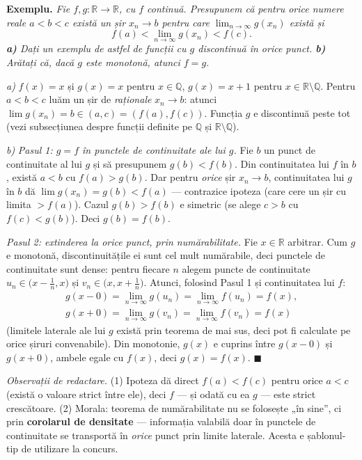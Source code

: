 \textbf{Exemplu.} \emph{Fie $f,g:\mathbb{R}\to\mathbb{R}$, cu $f$ continuă. Presupunem că pentru orice numere reale $a<b<c$ există un șir $x_n\to b$ pentru care $\lim_{n\to\infty}g(x_n)$ există și}
\[
f(a)<\lim_{n\to\infty}g(x_n)<f(c).
\]
\emph{\textbf{a)} Dați un exemplu de astfel de funcții cu $g$ discontinuă în orice punct. \textbf{b)} Arătați că, dacă $g$ este monotonă, atunci $f=g$.}

\smallskip
\emph{a)} $f(x)=x$ și $g(x)=x$ pentru $x\in\mathbb{Q}$, $g(x)=x+1$ pentru $x\in\mathbb{R}\setminus\mathbb{Q}$. Pentru $a<b<c$ luăm un șir de \emph{raționale} $x_n\to b$: atunci $\lim g(x_n)=b\in(a,c)=(f(a),f(c))$. Funcția $g$ e discontinuă peste tot (vezi subsecțiunea despre funcții definite pe $\mathbb{Q}$ și $\mathbb{R}\setminus\mathbb{Q}$).

\emph{b)} \emph{Pasul 1: $g=f$ în punctele de continuitate ale lui $g$.} Fie $b$ un punct de continuitate al lui $g$ și să presupunem $g(b)<f(b)$. Din continuitatea lui $f$ în $b$, există $a<b$ cu $f(a)>g(b)$. Dar pentru \emph{orice} șir $x_n\to b$, continuitatea lui $g$ în $b$ dă $\lim g(x_n)=g(b)<f(a)$ --- contrazice ipoteza (care cere un șir cu limita $>f(a)$). Cazul $g(b)>f(b)$ e simetric (se alege $c>b$ cu $f(c)<g(b)$). Deci $g(b)=f(b)$.

\emph{Pasul 2: extinderea la orice punct, prin numărabilitate.} Fie $x\in\mathbb{R}$ arbitrar. Cum $g$ e monotonă, discontinuitățile ei sunt cel mult numărabile, deci punctele de continuitate sunt dense: pentru fiecare $n$ alegem puncte de continuitate $u_n\in\big(x-\tfrac1n,x\big)$ și $v_n\in\big(x,x+\tfrac1n\big)$. Atunci, folosind Pasul 1 și continuitatea lui $f$:
\[
\begin{gathered}
g(x-0)=\lim_{n\to\infty}g(u_n)=\lim_{n\to\infty}f(u_n)=f(x),\\
g(x+0)=\lim_{n\to\infty}g(v_n)=\lim_{n\to\infty}f(v_n)=f(x)
\end{gathered}
\]
(limitele laterale ale lui $g$ există prin teorema de mai sus, deci pot fi calculate pe orice șiruri convenabile). Din monotonie, $g(x)$ e cuprins între $g(x-0)$ și $g(x+0)$, ambele egale cu $f(x)$, deci $g(x)=f(x)$. $\blacksquare$

\smallskip
\emph{Observații de redactare.} (1) Ipoteza dă direct $f(a)<f(c)$ pentru orice $a<c$ (există o valoare strict între ele), deci $f$ --- și odată cu ea $g$ --- este strict crescătoare. (2) Morala: teorema de numărabilitate nu se folosește „în sine'', ci prin \textbf{corolarul de densitate} --- informația valabilă doar în punctele de continuitate se transportă în \emph{orice} punct prin limite laterale. Acesta e șablonul-tip de utilizare la concurs.


